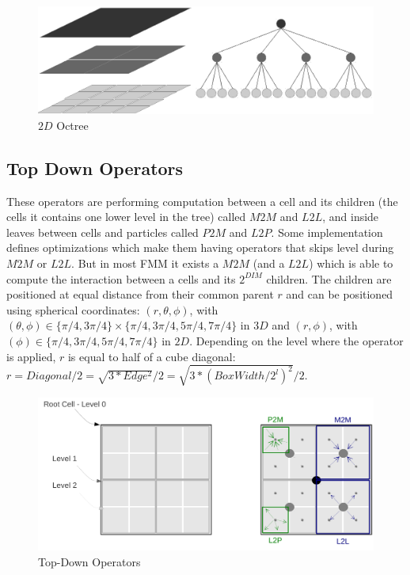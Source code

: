\documentclass[12pt]{article} %
\begin{document}
\begin{figure}[h]
\centering
\includegraphics[scale=0.6]{Images/Octree}
\caption{$2D$ Octree}
\end{figure}

\subsection{Top Down Operators}
These operators are performing computation between a cell and its children (the cells it contains one lower level in the tree) called $M2M$ and $L2L$,
and inside leaves between cells and particles called $P2M$ and $L2P$.
Some implementation defines optimizations which make them having operators that skips level during $M2M$ or $L2L$.
But in most FMM it exists a $M2M$ (and a $L2L$) which is able to compute the interaction between a cells and its $2^{DIM}$ children.
The children are positioned at equal distance from their common parent $r$ and can be positioned using spherical coordinates:
$(r,\theta,\phi)$, with $(\theta,\phi) \in \{\pi/4,3\pi/4\} \times \{\pi/4, 3\pi/4, 5\pi/4, 7\pi/4\}$ in $3D$ and
$(r,\phi)$, with $(\phi) \in \{\pi/4, 3\pi/4, 5\pi/4, 7\pi/4\}$ in $2D$.
Depending on the level where the operator is applied, $r$ is equal to half of a cube diagonal:
$r = Diagonal/2 = \sqrt{ 3 * Edge^2 }/2 = \sqrt{ 3 * (BoxWidth/2^{l})^2 }/2$.

\begin{figure}[h]
\centering
\includegraphics[scale=0.6]{Images/TopDownOperators}
\caption{Top-Down Operators}
\end{figure}
\end{document}
